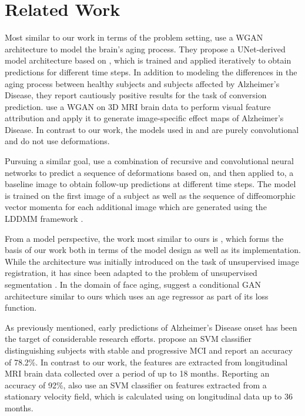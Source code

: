 \section{Related Work}
Most similar to our work in terms of the problem setting, \cite{wegmayr2019generative} use a WGAN architecture to model the brain's aging process. They propose a UNet-derived \cite{ronneberger2015unet} model architecture based on \cite{baumgartner2018visual}, which is trained and applied iteratively to obtain predictions for different time steps. In addition to modeling the differences in the aging process between healthy subjects and subjects affected by Alzheimer's Disease, they report cautiously positive results for the task of conversion prediction.
\cite{baumgartner2018visual} use a WGAN on 3D MRI brain data to perform visual feature attribution and apply it to generate image-specific effect maps of Alzheimer's Disease.
In contrast to our work, the models used in \cite{wegmayr2019generative} and \cite{baumgartner2018visual} are purely convolutional and do not use deformations.

Pursuing a similar goal, \cite{pathan2018predictive} use a combination of recursive and convolutional neural networks to predict a sequence of deformations based on, and then applied to, a baseline image to obtain follow-up predictions at different time steps. The model is trained on the first image of a subject as well as the sequence of diffeomorphic vector momenta for each additional image which are generated using the LDDMM framework \cite{beg2005computing}.

From a model perspective, the work most similar to ours is \cite{balakrishnan2019voxelmorph} \cite{dalca2018unsupervised}, which forms the basis of our work both in terms of the model design as well as its implementation. While the architecture was initially introduced on the task of unsupervised image registration, it has since been adapted to the problem of unsupervised segmentation \cite{dalca2019unsupervised}.
In the domain of face aging, \cite{palsson2018generative} suggest a conditional GAN \cite{mirza2014conditional} architecture similar to ours which uses an age regressor as part of its loss function.

As previously mentioned, early predictions of Alzheimer's Disease onset has been the target of considerable research efforts. \cite{thung2016identification} propose an SVM classifier distinguishing subjects with stable and progressive MCI and report an accuracy of 78.2\%. In contrast to our work, the features are extracted from longitudinal MRI brain data collected over a period of up to 18 months.
Reporting an accuracy of 92\%, \cite{sun2017detection} also use an SVM classifier on features extracted from a stationary velocity field, which is calculated using \cite{vercauteren2009diffeomorphic} on longitudinal data up to 36 months.


